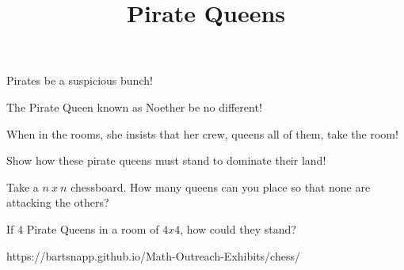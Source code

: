 \documentclass{../exhibit}
\title{Pirate Queens}
\begin{document}
\begin{context}
  Pirates be a suspicious bunch!


  The Pirate Queen known as Noether be no different!


  When in the rooms, she insists that her crew, queens all of them, take the room!

    
  Show how these pirate queens must stand to dominate their land!
\end{context}



\begin{directions}
  Take a $n\ x\ n$ chessboard. How many queens can you place so that
  none are attacking the others?
\end{directions}



\begin{example}
 If $4$ Pirate Queens in a room of $4x4$, how could they stand?
\begin{center}
\end{center}
\end{example}



\begin{mathConnections}
  https://bartsnapp.github.io/Math-Outreach-Exhibits/chess/
\end{mathConnections}
\end{document}
